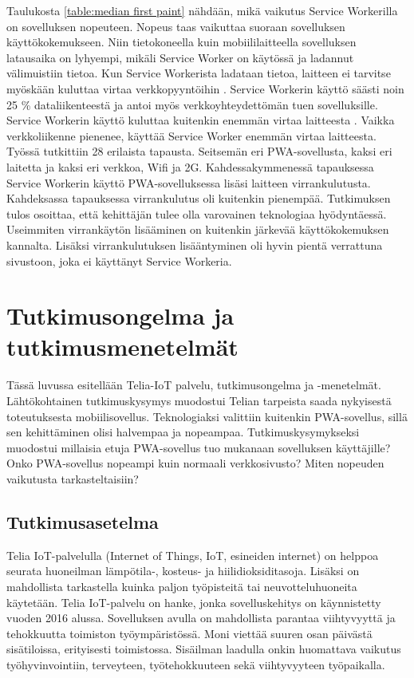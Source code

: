 \documentclass{tktltiki}
\begin{document}
Taulukosta \ref{table:median first paint} nähdään, mikä vaikutus Service Workerilla on sovelluksen nopeuteen. Nopeus taas vaikuttaa suoraan sovelluksen käyttökokemukseen. Niin tietokoneella kuin mobiililaitteella sovelluksen latausaika on lyhyempi, mikäli Service Worker on käytössä ja ladannut välimuistiin tietoa. Kun Service Workerista ladataan tietoa, laitteen ei tarvitse myöskään kuluttaa virtaa verkkopyyntöihin \cite{8456349}. Service Workerin käyttö säästi noin 25 \% dataliikenteestä ja antoi myös verkkoyhteydettömän tuen sovelluksille. Service Workerin käyttö kuluttaa kuitenkin enemmän virtaa laitteesta \cite{malavolta2017assessing}. Vaikka verkkoliikenne pienenee, käyttää Service Worker enemmän virtaa laitteesta. Työssä tutkittiin 28 erilaista tapausta. Seitsemän eri PWA-sovellusta, kaksi eri laitetta ja kaksi eri verkkoa, Wifi ja 2G. Kahdessakymmenessä tapauksessa Service Workerin käyttö PWA-sovelluksessa lisäsi laitteen virrankulutusta. Kahdeksassa tapauksessa virrankulutus oli kuitenkin pienempää. Tutkimuksen tulos osoittaa, että kehittäjän tulee olla varovainen teknologiaa hyödyntäessä. Useimmiten virrankäytön lisääminen on kuitenkin järkevää käyttökokemuksen kannalta. Lisäksi virrankulutuksen lisääntyminen oli hyvin pientä verrattuna sivustoon, joka ei käyttänyt Service Workeria.

\newpage
\section{Tutkimusongelma ja tutkimusmenetelmät}

Tässä luvussa esitellään Telia-IoT palvelu, tutkimusongelma ja -menetelmät. Lähtökohtainen tutkimuskysymys muodostui Telian tarpeista saada nykyisestä toteutuksesta mobiilisovellus. Teknologiaksi valittiin kuitenkin PWA-sovellus, sillä sen kehittäminen olisi halvempaa ja nopeampaa. Tutkimuskysymykseksi muodostui millaisia etuja PWA-sovellus tuo mukanaan sovelluksen käyttäjille? Onko PWA-sovellus nopeampi kuin normaali verkkosivusto? Miten nopeuden vaikutusta tarkasteltaisiin?

\subsection{Tutkimusasetelma}

Telia IoT-palvelulla (Internet of Things, IoT, esineiden internet) on helppoa seurata huoneilman lämpötila-, kosteus- ja hiilidioksiditasoja. Lisäksi on mahdollista tarkastella kuinka paljon työpisteitä tai neuvotteluhuoneita käytetään. Telia IoT-palvelu on hanke, jonka sovelluskehitys on käynnistetty vuoden 2016 alussa. Sovelluksen avulla on mahdollista parantaa viihtyvyyttä ja tehokkuutta toimiston työympäristössä. Moni viettää suuren osan päivästä sisätiloissa, erityisesti toimistossa. Sisäilman laadulla onkin huomattava vaikutus työhyvinvointiin, terveyteen, työtehokkuuteen sekä viihtyvyyteen työpaikalla. 
\end{document}
